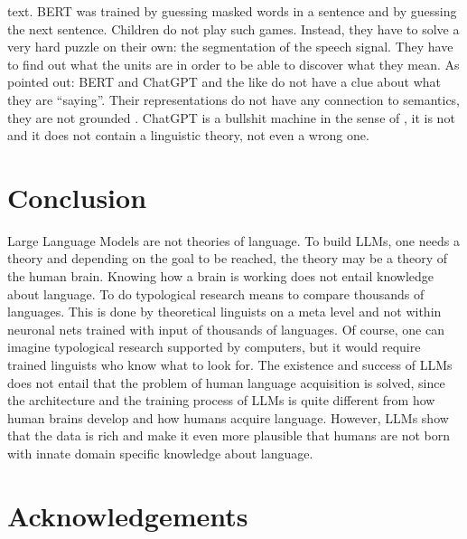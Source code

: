 text. BERT was trained by guessing masked words in a sentence and by guessing the next
sentence. Children do not play such games. Instead, they have to solve a very hard puzzle on their own:
the segmentation of the speech signal. They have to find out what the units are in order to be able
to discover what they mean. 
%
As \citet{BK2020a} pointed
out: BERT and ChatGPT and the like do not have a clue about what they are ``saying''. Their representations do not have any
connection to semantics, they are not grounded \citep{BeulsVanEcke2024a}. ChatGPT is a bullshit machine in the sense of
\citet{HicksHumphriesSlater2024a}, it is not and it does not contain a linguistic theory, not even a
wrong one.
%


\section{Conclusion}

Large Language Models are not theories of language. To build LLMs, one needs a theory and depending
on the goal to be reached, the theory may be a theory of the human brain. Knowing how a brain is
working does not entail knowledge about language. To do typological research means to compare
thousands of languages. This is done by theoretical linguists on a meta level and not within
neuronal nets trained with input of thousands of languages. Of course, one can imagine typological
research supported by computers, but it would require trained linguists who know what to look for.
The existence and success of LLMs does not entail
that the problem of human language acquisition is solved, since the architecture and the training
process of LLMs is quite different from how human brains develop and how humans acquire
language. However, LLMs show that the data is rich and make it even more plausible that humans are
not born with innate domain specific knowledge about language.

\section*{Acknowledgements}

